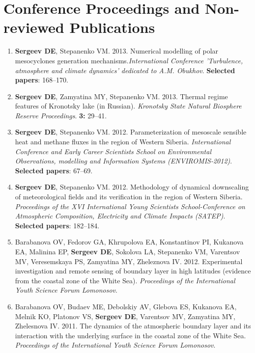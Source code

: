 \documentclass[a4paper,11pt]{article}
\makeatletter
\newlength{\bibhang}
\newlength{\bibsep}
 {\@listi \global\bibsep\itemsep \global\advance\bibsep by\parsep}
\newenvironment{bibsection}%
        {\begin{enumerate}{}{%
       \setlength{\leftmargin}{\bibhang}%
       \setlength{\itemindent}{-\leftmargin}%
       \setlength{\itemsep}{\bibsep}%
       \setlength{\parsep}{\z@}%
        \setlength{\partopsep}{0pt}%
        \setlength{\topsep}{0pt}}}
        {\end{enumerate}\vspace{-.6\baselineskip}}
\makeatother
\begin{document}
\section{Conference Proceedings and Non-reviewed Publications}
\begin{bibsection}
    \item {\bf Sergeev DE}, Stepanenko VM. 2013. Numerical modelling of polar mesocyclones generation mechanisms.\emph{International Conference 'Turbulence, atmosphere and climate dynamics' dedicated to A.M. Obukhov}. {\bf Selected papers}: 168--170.
    \item {\bf Sergeev DE}, Zamyatina MY, Stepanenko VM. 2013. Thermal regime features of Kronotsky lake (in Russian). \emph{Kronotsky State Natural Biosphere Reserve Proceedings}. \textbf{3:} 29--41.
    \item {\bf Sergeev DE}, Stepanenko VM. 2012. Parameterization of mesoscale sensible heat and methane fluxes in the region of Western Siberia. \emph{International Conference and Early Career Scientists School on Environmental Observations, modelling and Information Systems (ENVIROMIS-2012)}. {\bf Selected papers}: 67--69.
    \item {\bf Sergeev DE}, Stepanenko VM. 2012. Methodology of dynamical downscaling of meteorological fields and its verification in the region of Western Siberia. \emph{Proceedings of the XVI International Young Scientists School-Conference on Atmospheric Composition, Electricity and Climate Impacts (SATEP)}. {\bf Selected papers}: 182--184.
    \item Barabanova OV, Fedorov GA, Khrupolova EA, Konstantinov PI, Kukanova EA, Malinina EP, {\bf Sergeev DE}, Sokolova LA, Stepanenko VM, Varentsov MV, Veresemskaya PS, Zamyatina MY, Zheleznova IV. 2012. Experimental investigation and remote sensing of boundary layer in high latitudes (evidence from the coastal zone of the White Sea). \emph{Proceedings of the International Youth Science Forum Lomonosov}.
    \item Barabanova OV, Budaev ME, Debolskiy AV, Glebova ES, Kukanova EA, Melnik KO, Platonov VS,  {\bf Sergeev DE}, Varentsov MV, Zamyatina MY, Zhelesnova IV. 2011. The dynamics of the atmospheric boundary layer and its interaction with the underlying surface in the coastal zone of the White Sea. \emph{Proceedings of the International Youth Science Forum Lomonosov}.
\end{bibsection}
\end{document}
